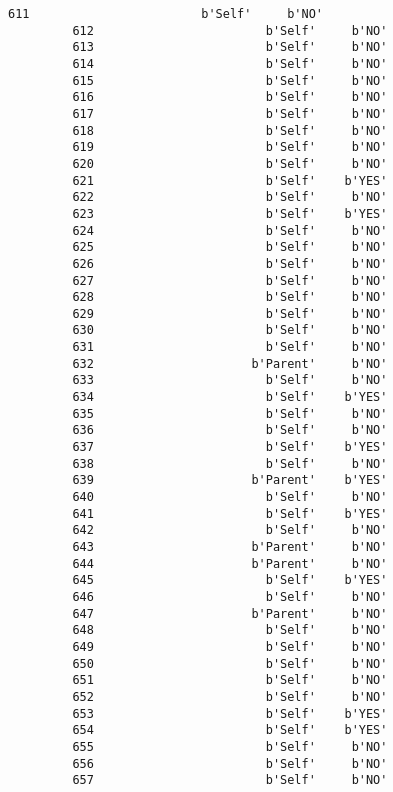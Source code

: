 \documentclass[11pt]{article}
\begin{document}
\begin{Verbatim}[commandchars=\\\{\}]
         611                        b'Self'     b'NO'  
         612                        b'Self'     b'NO'  
         613                        b'Self'     b'NO'  
         614                        b'Self'     b'NO'  
         615                        b'Self'     b'NO'  
         616                        b'Self'     b'NO'  
         617                        b'Self'     b'NO'  
         618                        b'Self'     b'NO'  
         619                        b'Self'     b'NO'  
         620                        b'Self'     b'NO'  
         621                        b'Self'    b'YES'  
         622                        b'Self'     b'NO'  
         623                        b'Self'    b'YES'  
         624                        b'Self'     b'NO'  
         625                        b'Self'     b'NO'  
         626                        b'Self'     b'NO'  
         627                        b'Self'     b'NO'  
         628                        b'Self'     b'NO'  
         629                        b'Self'     b'NO'  
         630                        b'Self'     b'NO'  
         631                        b'Self'     b'NO'  
         632                      b'Parent'     b'NO'  
         633                        b'Self'     b'NO'  
         634                        b'Self'    b'YES'  
         635                        b'Self'     b'NO'  
         636                        b'Self'     b'NO'  
         637                        b'Self'    b'YES'  
         638                        b'Self'     b'NO'  
         639                      b'Parent'    b'YES'  
         640                        b'Self'     b'NO'  
         641                        b'Self'    b'YES'  
         642                        b'Self'     b'NO'  
         643                      b'Parent'     b'NO'  
         644                      b'Parent'     b'NO'  
         645                        b'Self'    b'YES'  
         646                        b'Self'     b'NO'  
         647                      b'Parent'     b'NO'  
         648                        b'Self'     b'NO'  
         649                        b'Self'     b'NO'  
         650                        b'Self'     b'NO'  
         651                        b'Self'     b'NO'  
         652                        b'Self'     b'NO'  
         653                        b'Self'    b'YES'  
         654                        b'Self'    b'YES'  
         655                        b'Self'     b'NO'  
         656                        b'Self'     b'NO'  
         657                        b'Self'     b'NO'  

\end{Verbatim}
\end{document}
